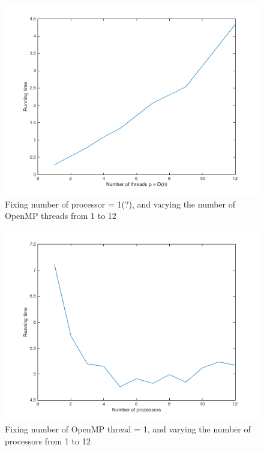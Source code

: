 \documentclass[11pt]{article}
\begin{document}
\begin{figure}[H]
	\begin{center}
		\includegraphics[width=12cm]{weakplot}
		\caption{Fixing number of processor = 1(?), and varying the number of OpenMP threads from 1 to 12 }
			\label{fig:weakplot}
	\end{center}
\end{figure}

\begin{figure}[H]
	\begin{center}
		\includegraphics[width=12cm]{strongplot}
		\caption{Fixing number of OpenMP thread = 1, and varying the number of processors from 1 to 12}
		\label{fig:strongplot}
	\end{center}
\end{figure}
\end{document}
